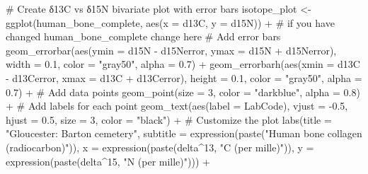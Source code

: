 \documentclass[
]{agujournal2019}
\newenvironment{Shaded}{\begin{snugshade}}{\end{snugshade}}
\newcommand{\AttributeTok}[1]{\textcolor[rgb]{0.40,0.45,0.13}{#1}}
\newcommand{\CommentTok}[1]{\textcolor[rgb]{0.37,0.37,0.37}{#1}}
\newcommand{\DecValTok}[1]{\textcolor[rgb]{0.68,0.00,0.00}{#1}}
\newcommand{\FloatTok}[1]{\textcolor[rgb]{0.68,0.00,0.00}{#1}}
\newcommand{\FunctionTok}[1]{\textcolor[rgb]{0.28,0.35,0.67}{#1}}
\newcommand{\NormalTok}[1]{\textcolor[rgb]{0.00,0.23,0.31}{#1}}
\newcommand{\OtherTok}[1]{\textcolor[rgb]{0.00,0.23,0.31}{#1}}
\newcommand{\SpecialCharTok}[1]{\textcolor[rgb]{0.37,0.37,0.37}{#1}}
\newcommand{\StringTok}[1]{\textcolor[rgb]{0.13,0.47,0.30}{#1}}
\begin{document}
\begin{Shaded}
\begin{Highlighting}[]
\CommentTok{\# Create δ13C vs δ15N bivariate plot with error bars}
\NormalTok{isotope\_plot }\OtherTok{\textless{}{-}} \FunctionTok{ggplot}\NormalTok{(human\_bone\_complete, }\FunctionTok{aes}\NormalTok{(}\AttributeTok{x =}\NormalTok{ d13C, }\AttributeTok{y =}\NormalTok{ d15N)) }\SpecialCharTok{+} \CommentTok{\# if you have changed human\_bone\_complete change here}
  \CommentTok{\# Add error bars}
  \FunctionTok{geom\_errorbar}\NormalTok{(}\FunctionTok{aes}\NormalTok{(}\AttributeTok{ymin =}\NormalTok{ d15N }\SpecialCharTok{{-}}\NormalTok{ d15Nerror, }\AttributeTok{ymax =}\NormalTok{ d15N }\SpecialCharTok{+}\NormalTok{ d15Nerror), }
                \AttributeTok{width =} \FloatTok{0.1}\NormalTok{, }\AttributeTok{color =} \StringTok{"gray50"}\NormalTok{, }\AttributeTok{alpha =} \FloatTok{0.7}\NormalTok{) }\SpecialCharTok{+}
  \FunctionTok{geom\_errorbarh}\NormalTok{(}\FunctionTok{aes}\NormalTok{(}\AttributeTok{xmin =}\NormalTok{ d13C }\SpecialCharTok{{-}}\NormalTok{ d13Cerror, }\AttributeTok{xmax =}\NormalTok{ d13C }\SpecialCharTok{+}\NormalTok{ d13Cerror), }
                 \AttributeTok{height =} \FloatTok{0.1}\NormalTok{, }\AttributeTok{color =} \StringTok{"gray50"}\NormalTok{, }\AttributeTok{alpha =} \FloatTok{0.7}\NormalTok{) }\SpecialCharTok{+}
  \CommentTok{\# Add data points}
  \FunctionTok{geom\_point}\NormalTok{(}\AttributeTok{size =} \DecValTok{3}\NormalTok{, }\AttributeTok{color =} \StringTok{"darkblue"}\NormalTok{, }\AttributeTok{alpha =} \FloatTok{0.8}\NormalTok{) }\SpecialCharTok{+}
  \CommentTok{\# Add labels for each point}
  \FunctionTok{geom\_text}\NormalTok{(}\FunctionTok{aes}\NormalTok{(}\AttributeTok{label =}\NormalTok{ LabCode), }
            \AttributeTok{vjust =} \SpecialCharTok{{-}}\FloatTok{0.5}\NormalTok{, }\AttributeTok{hjust =} \FloatTok{0.5}\NormalTok{, }\AttributeTok{size =} \DecValTok{3}\NormalTok{, }\AttributeTok{color =} \StringTok{"black"}\NormalTok{) }\SpecialCharTok{+}
  \CommentTok{\# Customize the plot}
  \FunctionTok{labs}\NormalTok{(}\AttributeTok{title =} \StringTok{"Gloucester: Barton cemetery"}\NormalTok{,}
       \AttributeTok{subtitle =} \FunctionTok{expression}\NormalTok{(}\FunctionTok{paste}\NormalTok{(}\StringTok{"Human bone collagen (radiocarbon)"}\NormalTok{)),}
       \AttributeTok{x =} \FunctionTok{expression}\NormalTok{(}\FunctionTok{paste}\NormalTok{(delta}\SpecialCharTok{\^{}}\DecValTok{13}\NormalTok{, }\StringTok{"C (per mille)"}\NormalTok{)),}
       \AttributeTok{y =} \FunctionTok{expression}\NormalTok{(}\FunctionTok{paste}\NormalTok{(delta}\SpecialCharTok{\^{}}\DecValTok{15}\NormalTok{, }\StringTok{"N (per mille)"}\NormalTok{))) }\SpecialCharTok{+}

\end{Highlighting}
\end{Shaded}
\end{document}
